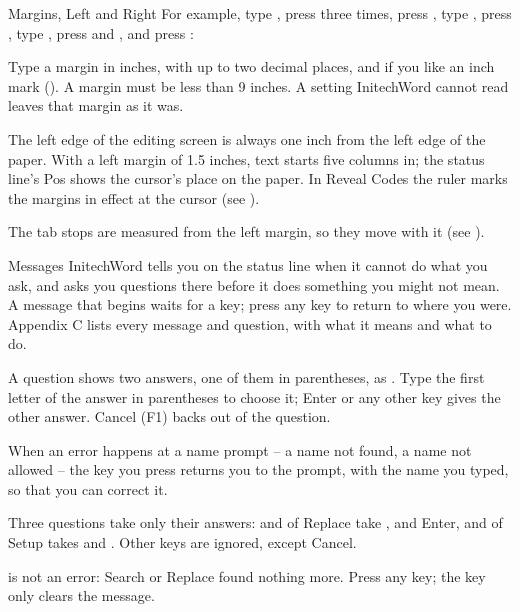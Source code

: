 \begin{Feature}{Margins, Left and Right}
For example, type , press  three
times, press , type
, press , type , press
 and , and press
:
\EndReplay

Type a margin in inches, with up to two decimal places, and if you like an
inch mark ().  A margin must be less than 9 inches.  A setting
InitechWord cannot read leaves that margin as it was.

The left edge of the editing screen is always one inch from the left edge
of the paper.  With a left margin of 1.5 inches, text starts five columns in;
the status line's Pos shows the cursor's place on the paper.  In Reveal
Codes the ruler marks the margins in effect at the cursor (see ).

The tab stops are measured from the left margin, so they move with it (see
).

\end{Feature}

\begin{Feature}{Messages}
InitechWord tells you on the status line when it cannot do what you ask,
and asks you questions there before it does something you might not mean.
A message that begins  waits for a key; press any key to return
to where you were.  Appendix C lists every message and question, with what
it means and what to do.

\Notes
{}
A question shows two answers, one of them in parentheses, as
.  Type the first letter of the answer in parentheses
to choose it; Enter or any other key gives the other answer.  Cancel (F1)
backs out of the question.

When an error happens at a name prompt -- a name not found, a name not
allowed -- the key you press returns you to the prompt, with the name you
typed, so that you can correct it.

Three questions take only their answers:  and
 of Replace take ,  and Enter, and
 of Setup takes  and
.  Other keys are ignored, except Cancel.

 is not an error: Search or Replace found nothing more.
Press any key; the key only clears the message.

\end{Feature}

